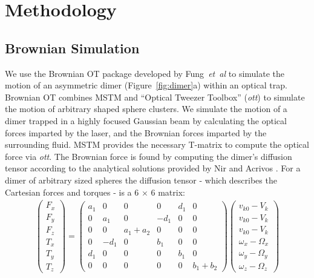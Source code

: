 \documentclass[final,  3p]{elsarticle}
\begin{document}
\printnomenclature[0.55in]

\section{Methodology}
\label{sec:Method}

\subsection{Brownian Simulation}
\label{sec:brownian}

We use the Brownian OT package developed by Fung~\textit{et~al} \cite{Vigilante2020Brownian_OT} to simulate the motion of an asymmetric dimer (Figure~\ref{fig:dimer}a) within an optical trap. Brownian OT combines MSTM \cite{Mishchenko1996MSTM} and ``Optical Tweezer Toolbox'' (\textit{ott}) \cite{Lenton2020} to simulate the motion of arbitrary
shaped sphere clusters. We simulate the motion of a dimer trapped in a 
highly focused Gaussian beam by calculating the optical forces imparted by 
the laser, and the Brownian forces imparted by the surrounding fluid. MSTM provides the necessary T-matrix to compute the optical force via \textit{ott}. The Brownian force is found by computing the dimer's diffusion tensor according to the analytical solutions provided by Nir and Acrivos \cite{nir_acrivos_1973}. For a dimer of arbitrary sized spheres the diffusion tensor - which describes the Cartesian forces and torques - is a 6 $\times$ 6 matrix:
\begin{align}
	\begin{pmatrix}
		F_x \\ F_y \\ F_z \\ T_x \\ T_y \\ T_z 
	\end{pmatrix}
	= \begin{pmatrix}
	a_1 &   0  &     0     &   0  & d_1 &     0 \\
	 0  &  a_1 &     0     & -d_1 &  0  &     0 \\
	 0  &   0  & a_1 + a_2 &   0  &  0  &     0 \\
	 0  & -d_1 &     0     &  b_1 &  0  &     0 \\
	d_1 &   0  &     0     &   0  & b_1 &     0 \\
	 0  &   0  &     0     &   0  &  0  & b_1 + b_2     
	\end{pmatrix}
	\begin{pmatrix}
		v_{k0} - V_k \\ v_{k0} - V_k \\ v_{k0} - V_k \\
		\omega_x - \Omega_x \\ \omega_y - \Omega_y \\ \omega_z - \Omega_z
	\end{pmatrix}
\end{align}
\end{document}
